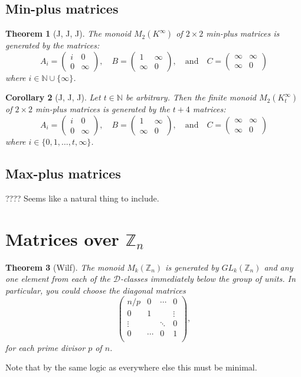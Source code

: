 \documentclass[11pt]{article}
\newtheorem{thm}{Theorem}[section]
\newtheorem{cor}[thm]{Corollary}
\numberwithin{equation}{section}
\newcommand{\D}{\mathscr{D}}
\newcommand{\N}{\mathbb{N}}
\newcommand{\mat}[4]{\begin{pmatrix}#1&#2\\#3&#4\end{pmatrix}}
\begin{document}
\subsection{Min-plus matrices}

\begin{thm}[J, J, J]\label{thm-min-plus}
  The monoid $M_{2}(K^{\infty})$ of $2 \times 2$ min-plus matrices is
  generated by the matrices:
  \begin{equation*}
          A_{i} = \mat{i}{0}{0}{\infty},
    \quad B     = \mat{1}{\infty}{\infty}{0},
    \quad \text{and}
    \quad C     =  \mat{\infty}{\infty}{\infty}{0}
  \end{equation*}
  where $i \in \N \cup \{\infty\}$.
\end{thm}

\begin{cor}[J, J, J]\label{cor-finite-min-plus}
  Let $t \in \N$ be arbitrary. Then the finite monoid $M_{2}(K^{\infty}_t)$ of
  $2 \times 2$ min-plus matrices is generated by the $t + 4$ matrices:
  \begin{equation*}
          A_{i} = \mat{i}{0}{0}{\infty},
    \quad B     = \mat{1}{\infty}{\infty}{0},
    \quad \text{and}
    \quad C     =  \mat{\infty}{\infty}{\infty}{0}
  \end{equation*}
  where $i \in \{0, 1, \ldots, t, \infty\}$.
\end{cor}

\subsection{Max-plus matrices}
???? Seems like a natural thing to include.

\section{Matrices over $\mathbb{Z}_n$}

\begin{thm}[Wilf]
  The monoid $M_{k}(\mathbb{Z}_{n})$ is generated by $GL_{k}(\mathbb{Z}_{n})$ and
  any one element from each of the $\D$-classes immediately below the group of
  units. In particular, you could choose
  the diagonal matrices
  $$\begin{pmatrix}
    n/p    & 0      & \cdots & 0  \\
    0      & 1      &        & \vdots \\
    \vdots &        & \ddots & 0 \\
    0      & \cdots & 0      & 1  \\
   \end{pmatrix},$$
   for each prime divisor $p$ of $n$.
\end{thm}
Note that by the same logic as everywhere else this must be minimal.

\printbibliography
\end{document}
